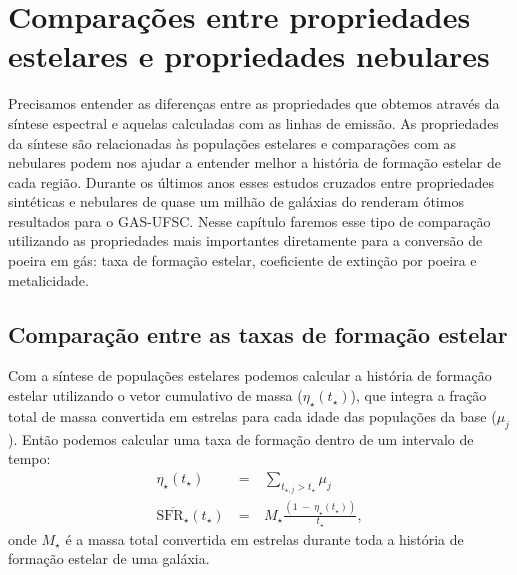 


\chapter{Comparações entre propriedades estelares e propriedades nebulares}
\label{sec:synvsneb}

Precisamos entender as diferenças entre as propriedades que obtemos através da síntese espectral e
aquelas calculadas com as linhas de emissão. As propriedades da síntese são relacionadas às
populações estelares e comparações com as nebulares podem nos ajudar a entender melhor a história de
formação estelar de cada região. Durante os últimos anos esses estudos cruzados entre propriedades
sintéticas e nebulares de quase um milhão de galáxias do \SDSS renderam ótimos resultados para o
GAS-UFSC. Nesse capítulo faremos esse tipo de comparação utilizando as propriedades mais importantes
diretamente para a conversão de poeira em gás: taxa de formação estelar, coeficiente de extinção por
poeira e metalicidade.

\section{Comparação entre as taxas de formação estelar}
\label{sec:synvsneb:SFR}

Com a síntese de populações estelares podemos calcular a história de formação estelar utilizando o
vetor cumulativo de massa ($\eta_\star(t_\star)$), que integra a fração total de massa convertida em
estrelas para cada idade das populações da base ($\mu_j$). Então podemos calcular uma taxa de
formação dentro de um intervalo de tempo:
\begin{eqnarray}
	\eta_\star(t_\star)\ &=&\ \sum\limits_{t_{\star,j} > t_\star} \mu_j \\
	\overline{\mathrm{SFR}_\star}(t_\star)\ &=&\ M_\star \frac{(1\ -\ \eta_\star(t_\star))}{t_\star},
	\label{eq:SFRSyn}
\end{eqnarray}
\noindent onde $M_\star$ é a massa total convertida em estrelas durante toda a história de
formação estelar de uma galáxia. 

